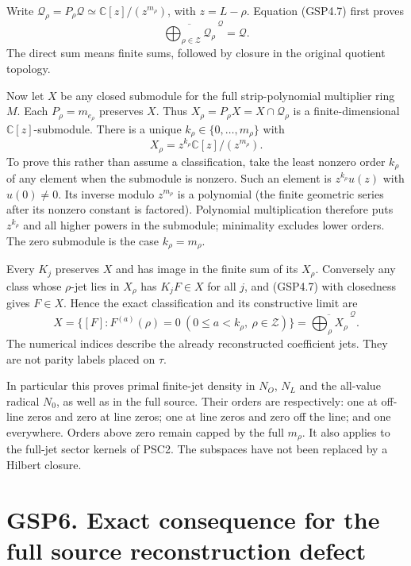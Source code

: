 Write
\(\mathcal Q_\rho=P_\rho\mathcal Q\simeq\mathbb C[z]/(z^{m_\rho})\),
with \(z=L-\rho\). Equation (GSP4.7) first proves \[
\overline{\bigoplus_{\rho\in\mathscr Z}\mathcal Q_\rho}^{\ \mathcal Q}=\mathcal Q.
\tag{GSP5.1}
\] The direct sum means finite sums, followed by closure in the original
quotient topology.

Now let \(X\) be any closed submodule for the full strip-polynomial
multiplier ring \(M\). Each \(P_\rho=m_{e_\rho}\) preserves \(X\). Thus
\(X_\rho=P_\rho X=X\cap\mathcal Q_\rho\) is a finite-dimensional
\(\mathbb C[z]\)-submodule. There is a unique
\(k_\rho\in\{0,\ldots,m_\rho\}\) with \[
X_\rho=z^{k_\rho}\mathbb C[z]/(z^{m_\rho}).
\tag{GSP5.2}
\] To prove this rather than assume a classification, take the least
nonzero order \(k_\rho\) of any element when the submodule is nonzero.
Such an element is \(z^{k_\rho}u(z)\) with \(u(0)\ne0\). Its inverse
modulo \(z^{m_\rho}\) is a polynomial (the finite geometric series after
its nonzero constant is factored). Polynomial multiplication therefore
puts \(z^{k_\rho}\) and all higher powers in the submodule; minimality
excludes lower orders. The zero submodule is the case \(k_\rho=m_\rho\).

Every \(K_j\) preserves \(X\) and has image in the finite sum of its
\(X_\rho\). Conversely any class whose \(\rho\)-jet lies in \(X_\rho\)
has \(K_jF\in X\) for all \(j\), and (GSP4.7) with closedness gives
\(F\in X\). Hence the exact classification and its constructive limit
are \[
\boxed{X=\{[F]:F^{(a)}(\rho)=0\ (0\le a<k_\rho,\ \rho\in\mathscr Z)\}
=\overline{\bigoplus_\rho X_\rho}^{\ \mathcal Q}.}
\tag{GSP5.3}
\] The numerical indices describe the already reconstructed coefficient
jets. They are not parity labels placed on \(\tau\).

In particular this proves primal finite-jet density in \(N_O\), \(N_L\)
and the all-value radical \(N_0\), as well as in the full source. Their
orders are respectively: one at off-line zeros and zero at line zeros;
one at line zeros and zero off the line; and one everywhere. Orders
above zero remain capped by the full \(m_\rho\). It also applies to the
full-jet sector kernels of PSC2. The subspaces have not been replaced by
a Hilbert closure.

\section{GSP6. Exact consequence for the full source reconstruction
defect}\label{gsp6.-exact-consequence-for-the-full-source-reconstruction-defect}

